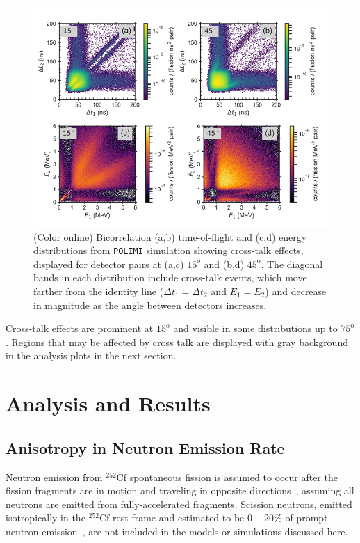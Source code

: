 \documentclass[preprint,12pt]{elsarticle}
\newcommand{\polimi}          {\texttt{POLIMI}\xspace}
\newcommand{\coloronline}     {(Color online)\xspace}
\newcommand{\Dto}{\ensuremath{\Delta t_1}\xspace}
\newcommand{\Dtt}{\ensuremath{\Delta t_2}\xspace}
\newcommand{\Eo}{\ensuremath{E_1}\xspace}
\newcommand{\Et}{\ensuremath{E_2}\xspace}
\newcommand{\degrees}[1]{\ensuremath{#1^{\mathrm{o}}}\xspace}
\newcommand{\Cftft}{\ensuremath{^{252}\text{Cf}}\xspace}
\begin{document}
\begin{figure}[!t]
	\centering
	\includegraphics[trim={0cm 0.5cm .5cm .5cm},clip,width=7in]{bhm_ct.png}
	\caption{\coloronline Bicorrelation (a,b) time-of-flight and (c,d) energy distributions from \polimi simulation showing cross-talk effects, displayed for  detector pairs at (a,c) \degrees{15} and (b,d) \degrees{45}. The diagonal bands in each distribution include cross-talk events, which move farther from the identity line ($\Dto=\Dtt$ and $\Eo=\Et$) and decrease in magnitude as the angle between detectors increases. }
	\label{fig:crosstalk}
\end{figure}

Cross-talk effects are prominent at \degrees{15} and visible in some distributions up to \degrees{75}. Regions that may be affected by cross talk are displayed with gray background in the analysis plots in the next section. 

\section{Analysis and Results}

\subsection{Anisotropy in Neutron Emission Rate}\label{sec:asym}

Neutron emission from \Cftft spontaneous fission is assumed to occur after the fission fragments are in motion and traveling in opposite directions~\cite{Vorobyev2009}, assuming all neutrons are emitted from fully-accelerated fragments. Scission neutrons, emitted isotropically in the \Cftft rest frame and estimated to be $0-20\%$ of prompt neutron emission~\cite{Vogt2014,Petrov2005,Chietera2018}, are not included in the models or simulations discussed here.
\end{document}
